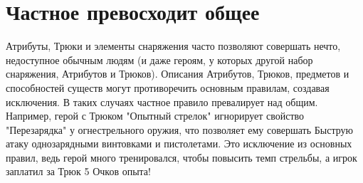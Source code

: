 \section{Частное превосходит общее}
Атрибуты, Трюки и элементы снаряжения часто позволяют совершать нечто, недоступное обычным людям (и даже героям, у которых другой набор снаряжения, Атрибутов и Трюков). Описания Атрибутов, Трюков, предметов и способностей существ могут противоречить основным правилам, создавая исключения. В таких случаях частное правило превалирует над общим. Например, герой с Трюком "Опытный стрелок" игнорирует свойство "Перезарядка" у огнестрельного оружия, что позволяет ему совершать Быструю атаку однозарядными винтовками и пистолетами. Это исключение из основных правил, ведь герой много тренировался, чтобы повысить темп стрельбы, а игрок заплатил за Трюк 5 Очков опыта!